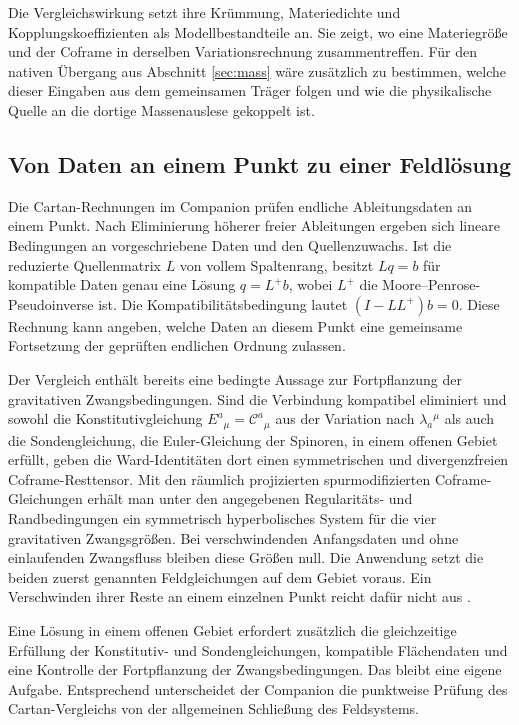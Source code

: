 Die Vergleichswirkung setzt ihre Krümmung, Materiedichte und Kopplungskoeffizienten als Modellbestandteile an. Sie zeigt, wo eine Mate\-rie\-größe und der Coframe in derselben Variationsrechnung zusammentreffen. Für den nativen Übergang aus Abschnitt \ref{sec:mass} wäre zusätzlich zu bestimmen, welche dieser Eingaben aus dem gemeinsamen Träger folgen und wie die physikalische Quelle an die dortige Massenauslese gekoppelt ist.

\subsection{Von Daten an einem Punkt zu einer Feldlösung}

Die Cartan-Rechnungen im Companion prüfen endliche Ableitungsdaten an einem Punkt. Nach Eliminierung höherer freier Ableitungen ergeben sich lineare Bedingungen an vorgeschriebene Daten und den Quellenzuwachs. Ist die reduzierte Quellenmatrix \(L\) von vollem Spaltenrang, besitzt \(Lq=b\) für kompatible Daten genau eine Lösung \(q=L^+b\), wobei \(L^+\) die Moore--Penrose-Pseudoinverse ist. Die Kompatibilitätsbedingung lautet \((I-LL^+)b=0\). Diese Rechnung kann angeben, welche Daten an diesem Punkt eine gemeinsame Fortsetzung der geprüften endlichen Ordnung zulassen.

Der Vergleich enthält bereits eine bedingte Aussage zur Fortpflanzung der gravitativen Zwangsbedingungen. Sind die Verbindung kompatibel eliminiert und sowohl die Konstitutivgleichung \(E^a{}_\mu=\mathcal C^a{}_\mu\) aus der Variation nach \(\lambda_a{}^\mu\) als auch die Sondengleichung, die Euler-Gleichung der Spinoren, in einem offenen Gebiet erfüllt, geben die Ward-Identitäten dort einen symmetrischen und divergenzfreien Coframe-Resttensor. Mit den räumlich projizierten spurmodifizierten Coframe-Gleichungen erhält man unter den angegebenen Regularitäts- und Randbedingungen ein symmetrisch hyperbolisches System für die vier gravitativen Zwangsgrößen. Bei verschwindenden Anfangsdaten und ohne einlaufenden Zwangsfluss bleiben diese Größen null. Die Anwendung setzt die beiden zuerst genannten Feldgleichungen auf dem Gebiet voraus. Ein Verschwinden ihrer Reste an einem einzelnen Punkt reicht dafür nicht aus \cite{companion,repo}.

Eine Lösung in einem offenen Gebiet erfordert zusätzlich die gleichzeitige Erfüllung der Konstitutiv- und Sondengleichungen, kompatible Flächendaten und eine Kontrolle der Fortpflanzung der Zwangsbedingungen. Das bleibt eine eigene Aufgabe. Entsprechend unterscheidet der Companion die punktweise Prüfung des Cartan-Vergleichs von der allgemeinen Schließung des Feldsystems.

